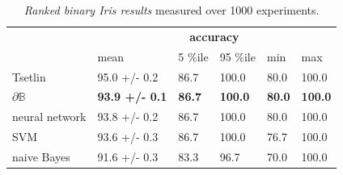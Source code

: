 \documentclass{article} %
\begin{document}
\begin{table}[t]
	\centering
	\begin{tabular}{llllll}
		\cline{2-6}
		\multicolumn{1}{c}{}                       & \multicolumn{5}{c}{\textbf{accuracy}}                                                                                                                                                            \\ \cline{2-6} 
		\multicolumn{1}{l|}{}                      & \multicolumn{1}{l|}{mean}                  & \multicolumn{1}{l|}{5 \%ile}       & \multicolumn{1}{l|}{95 \%ile}       & \multicolumn{1}{l|}{min}           & \multicolumn{1}{l|}{max}            \\ \hline
		\multicolumn{1}{|l|}{Tsetlin}              & \multicolumn{1}{l|}{95.0 +/- 0.2}          & \multicolumn{1}{l|}{86.7}          & \multicolumn{1}{l|}{100.0}          & \multicolumn{1}{l|}{80.0}          & \multicolumn{1}{l|}{100.0}          \\ \hline
		\multicolumn{1}{|l|}{$\partial\mathbb{B}$} & \multicolumn{1}{l|}{\textbf{93.9 +/- 0.1}} & \multicolumn{1}{l|}{\textbf{86.7}} & \multicolumn{1}{l|}{\textbf{100.0}} & \multicolumn{1}{l|}{\textbf{80.0}} & \multicolumn{1}{l|}{\textbf{100.0}} \\ \hline
		\multicolumn{1}{|l|}{neural network}       & \multicolumn{1}{l|}{93.8 +/- 0.2}          & \multicolumn{1}{l|}{86.7}          & \multicolumn{1}{l|}{100.0}           & \multicolumn{1}{l|}{80.0}          & \multicolumn{1}{l|}{100.0}           \\ \hline
		\multicolumn{1}{|l|}{SVM}                  & \multicolumn{1}{l|}{93.6 +/- 0.3}          & \multicolumn{1}{l|}{86.7}          & \multicolumn{1}{l|}{100.0}           & \multicolumn{1}{l|}{76.7}          & \multicolumn{1}{l|}{100.0}           \\ \hline
		\multicolumn{1}{|l|}{naive Bayes}          & \multicolumn{1}{l|}{91.6 +/- 0.3}          & \multicolumn{1}{l|}{83.3}          & \multicolumn{1}{l|}{96.7}           & \multicolumn{1}{l|}{70.0}          & \multicolumn{1}{l|}{100.0}           \\ \hline
	\end{tabular}
	\caption{{\em Ranked binary Iris results}  measured over 1000 experiments.}
	\label{tab:binary-iris-results}
\end{table}
\end{document}
